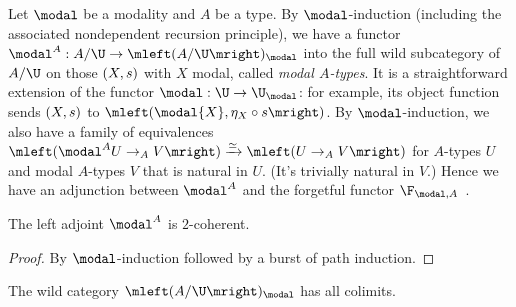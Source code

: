 \documentclass{lmcs}
\theoremstyle{definition}\newtheorem{note}[thm]{Note}
\begin{document}
Let $\modal$ be a modality and $A$ be a type. By $\modal$-induction (including the associated nondependent recursion principle), we have a functor $\modal^A : A/\U \to \mleft(A/\U\mright)_{\modal}$ into the full wild subcategory of $A/\U$ on those $\mleft(X,s\mright)$ with $X$ modal, called \emph{modal $A$-types}. It is a straightforward extension of the functor $\modal : \U \to \U_{\modal}$: for example, its object function sends $\mleft(X,s\mright)$ to $\mleft(\modal{X} , \eta_X \circ s \mright)$. By $\modal$-induction, we also have a family of equivalences $\mleft(\modal^A{U} \to_A V\mright) \xrightarrow{\simeq} \mleft(U \to_A V \mright)$ for $A$-types $U$ and modal $A$-types $V$ that is natural in $U$. (It's trivially natural in $V$.) Hence we have an adjunction between $\modal^A$ and the forgetful functor $\F_{\modal,A}$~\cite[]{2cohagda-pub}.
\begin{thm} \label{mod2coh}
The left adjoint $\modal^A$ is $2$-coherent.
\end{thm}
\begin{proof}
By $\modal$-induction followed by a burst of path induction.
\end{proof}
\begin{cor}  \label{modcolbuild}
The wild category $\mleft(A/\U\mright)_{\modal}$ has all colimits.
\end{cor}
\end{document}
